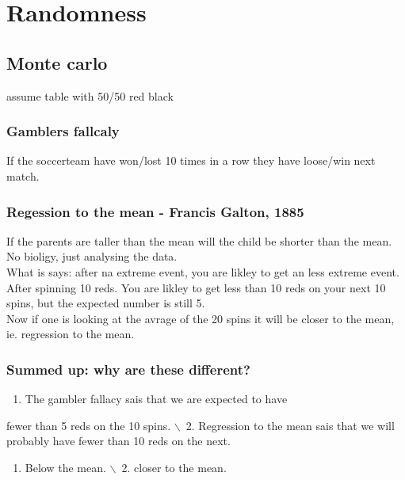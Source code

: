 \documentclass[a4paper,12pt]{article}
\author{nybo}
\date{\today}
\title{}
\begin{document}
\tableofcontents

\newpage
\section{Randomness}
\label{sec:org1ad3776}


\subsection{Monte carlo}
\label{sec:org6a0d5b6}
assume table with 50/50 red black
\subsubsection{Gamblers fallcaly}
\label{sec:org62b5db6}
If the soccerteam have won/lost 10 times in a row
 they have loose/win next match. 


\subsubsection{Regession to the mean - Francis Galton, 1885}
\label{sec:org7213e18}
If the parents are taller than the mean will the child 
be shorter than the mean. No bioligy, just analysing the 
data.\\
What is says: after na extreme event, you are likley to
 get an less extreme event. After spinning 10 reds. You 
are likley to get less than 10 reds on your next 
10 spins, but the expected number is still 5. \\
Now if one is looking at the avrage of the 20 
spins it will be closer to the mean, ie. 
regression to the mean. 



\subsubsection{Summed up: why are these different?}
\label{sec:orgafc196b}
\begin{enumerate}
\item The gambler fallacy sais that we are expected to have
\end{enumerate}
fewer than 5 reds on the 10 spins. $\backslash$\ 2. Regression to the mean
 sais that we will probably have fewer than 10 reds on the next. \\
\begin{enumerate}
\item Below the mean. $\backslash$\ 2. closer to the mean.
\end{enumerate}
\end{document}
